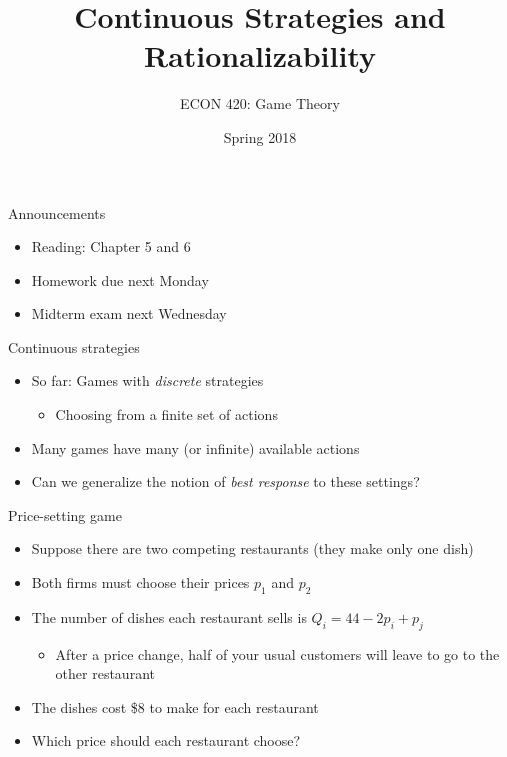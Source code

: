\documentclass[10pt]{beamer}
\author{ECON 420: Game Theory}
\date{Spring 2018}
\title{Continuous Strategies and Rationalizability}
\begin{document}
\maketitle


\begin{frame}[label={sec:org7b1ebf7}]{}
\alert{Announcements}
\begin{itemize}
\item Reading: Chapter 5 and 6
\item Homework due next Monday
\item Midterm exam next Wednesday
\end{itemize}
\end{frame}


\begin{frame}[label={sec:org4df1834}]{}
\alert{Continuous strategies}
\begin{itemize}
\item So far: Games with \emph{discrete} strategies
\begin{itemize}
\item Choosing from a finite set of actions
\end{itemize}
\item Many games have many (or infinite) available actions
\item Can we generalize the notion of \emph{best response} to these settings?
\end{itemize}
\end{frame}


\begin{frame}[label={sec:orgf715342}]{}
\alert{Price-setting game}
\begin{itemize}
\item Suppose there are two competing restaurants (they make only one dish)
\item Both firms must choose their prices \(p_1\) and \(p_2\)
\item The number of dishes each restaurant sells is \(Q_i = 44 - 2p_i + p_j\)
\begin{itemize}
\item After a price change, half of your usual customers will leave to go to the other restaurant
\end{itemize}
\item The dishes cost \$8 to make for each restaurant
\item Which price should each restaurant choose?
\end{itemize}
\end{frame}
\end{document}
